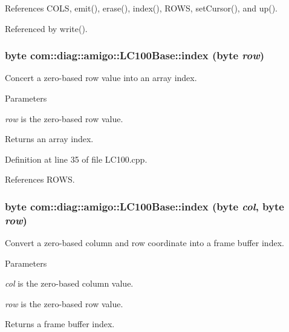 References COLS, emit(), erase(), index(), ROWS, setCursor(), and up().



Referenced by write().

\hypertarget{classcom_1_1diag_1_1amigo_1_1LC100Base_a2fea6d0b46f653633fdf7677b6ce1f67}{
\subsubsection[{index}]{\setlength{\rightskip}{0pt plus 5cm}byte com::diag::amigo::LC100Base::index (byte {\em row})}}
\label{classcom_1_1diag_1_1amigo_1_1LC100Base_a2fea6d0b46f653633fdf7677b6ce1f67}


Concert a zero-\/based row value into an array index. 


\begin{DoxyParams}{Parameters}
\item[{\em row}]is the zero-\/based row value. \end{DoxyParams}
\begin{DoxyReturn}{Returns}
an array index. 
\end{DoxyReturn}


Definition at line 35 of file LC100.cpp.



References ROWS.

\hypertarget{classcom_1_1diag_1_1amigo_1_1LC100Base_a01be594835cd4bef65fd611bb3e995be}{
\subsubsection[{index}]{\setlength{\rightskip}{0pt plus 5cm}byte com::diag::amigo::LC100Base::index (byte {\em col}, \/  byte {\em row})}}
\label{classcom_1_1diag_1_1amigo_1_1LC100Base_a01be594835cd4bef65fd611bb3e995be}


Convert a zero-\/based column and row coordinate into a frame buffer index. 


\begin{DoxyParams}{Parameters}
\item[{\em col}]is the zero-\/based column value. \item[{\em row}]is the zero-\/based row value. \end{DoxyParams}
\begin{DoxyReturn}{Returns}
a frame buffer index. 
\end{DoxyReturn}


